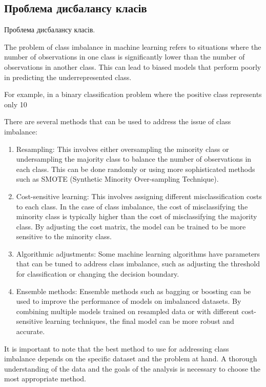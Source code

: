 \subsection{Проблема дисбалансу класів}

{
\color{red}
Проблема дисбалансу класів.

The problem of class imbalance in machine learning refers to situations where the number of observations in one class is significantly lower than the number of observations in another class. This can lead to biased models that perform poorly in predicting the underrepresented class. 

For example, in a binary classification problem where the positive class represents only 10%

There are several methods that can be used to address the issue of class imbalance:
\begin{enumerate}
    \item Resampling: This involves either oversampling the minority class or undersampling the majority class to balance the number of observations in each class. This can be done randomly or using more sophisticated methods such as SMOTE (Synthetic Minority Over-sampling Technique).
    \item Cost-sensitive learning: This involves assigning different misclassification costs to each class. In the case of class imbalance, the cost of misclassifying the minority class is typically higher than the cost of misclassifying the majority class. By adjusting the cost matrix, the model can be trained to be more sensitive to the minority class.
    \item Algorithmic adjustments: Some machine learning algorithms have parameters that can be tuned to address class imbalance, such as adjusting the threshold for classification or changing the decision boundary.
    \item Ensemble methods: Ensemble methods such as bagging or boosting can be used to improve the performance of models on imbalanced datasets. By combining multiple models trained on resampled data or with different cost-sensitive learning techniques, the final model can be more robust and accurate.

\end{enumerate}
    

It is important to note that the best method to use for addressing class imbalance depends on the specific dataset and the problem at hand. A thorough understanding of the data and the goals of the analysis is necessary to choose the most appropriate method.

}
